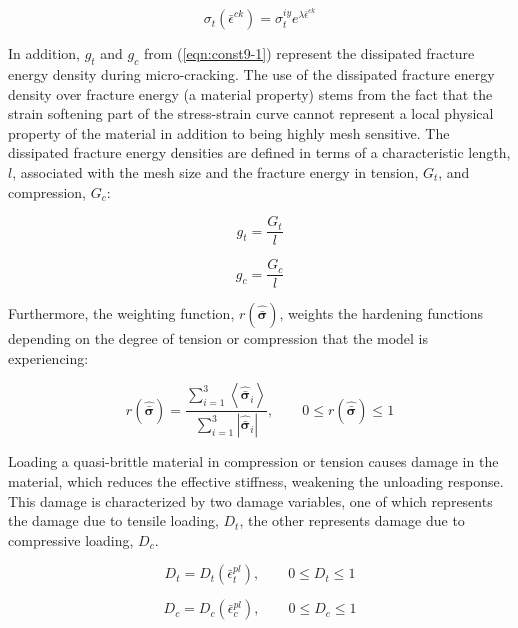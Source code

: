 \begin{equation}
\sigma_{t}\left(\bar{\epsilon}^{ck}\right)=\sigma_{t}^{iy}e^{\lambda\bar{\epsilon}^{ck}}
\label{eqn:dam1a}
\end{equation}

In addition, $g_t$ and $g_c$ from (\ref{eqn:const9-1}) represent the dissipated fracture energy density during micro-cracking. The use of the dissipated fracture energy density over fracture energy (a material property) stems from the fact that the strain softening part of the stress-strain curve cannot represent a local physical property of the material in addition to being highly mesh sensitive. The dissipated fracture energy densities are defined in terms of a characteristic length, $l$, associated with the mesh size and the fracture energy in tension, $G_t$, and compression, $G_c$: 

\begin{equation}
g_t = \frac{G_t}{l}
\label{eqn:dam1c}
\end{equation}

\begin{equation}
g_c = \frac{G_c}{l}
\label{eqn:dam1d}
\end{equation}

Furthermore, the weighting function, $r\left(\hat{\bar{\boldsymbol{\sigma}}}\right)$, weights the hardening functions depending on the degree of tension or compression that the model is experiencing:

\begin{equation}
r\left(\hat{\bar{\boldsymbol{\sigma}}}\right)=\frac{\sum_{i=1}^{3}\left\langle \hat{\bar{\boldsymbol{\sigma}}}_{i}\right\rangle }{\sum_{i=1}^{3}\left|\hat{\bar{\boldsymbol{\sigma}}}_{i}\right|},\qquad0\leq r\left(\hat{\bar{\boldsymbol{\sigma}}}\right)\leq1
\label{eqn:const9-2}
\end{equation}

Loading a quasi-brittle material in compression or tension causes damage in the material, which reduces the effective stiffness, weakening the unloading response. This damage is characterized by two damage variables, one of which represents the damage due to tensile loading, $D_{t}$, the other represents damage due to compressive loading, $D_{c}$. 

\begin{equation}
D_{t}=D_{t}\left(\bar{\epsilon}_{t}^{pl}\right),\qquad0\leq D_{t}\leq1
\label{eqn:dam2a}
\end{equation}

\begin{equation}
D_{c}=D_{c}\left(\bar{\epsilon}_{c}^{pl}\right),\qquad0\leq D_{c}\leq1
\label{eqn:dam2b}
\end{equation}

